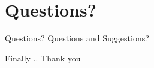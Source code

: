 \documentclass[xcolor=dvipsnames]{beamer}
\begin{document}
%	
%
%

\section{Questions?}
\begin{frame}{Questions?}
\centering
Questions and Suggestions? 
\end{frame}


\begin{frame}{Finally ..}
Thank you
\end{frame}
\end{document}

